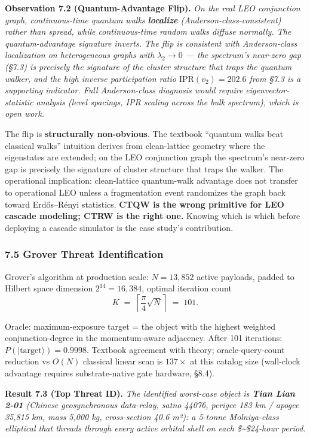 \documentclass[
]{article}
\begin{document}
\textbf{Observation 7.2 (Quantum-Advantage Flip).} \emph{On the real LEO
conjunction graph, continuous-time quantum walks \textbf{localize}
(Anderson-class-consistent) rather than spread, while continuous-time
random walks diffuse normally. The quantum-advantage signature inverts.
The flip is consistent with Anderson-class localization on heterogeneous
graphs with \(\lambda_2 \to 0\) --- the spectrum's near-zero gap (§7.3)
is precisely the signature of the cluster structure that traps the
quantum walker, and the high inverse participation ratio
\(\text{IPR}(v_2) = 202.6\) from §7.3 is a supporting indicator. Full
Anderson-class diagnosis would require eigenvector-statistic analysis
(level spacings, IPR scaling across the bulk spectrum), which is open
work.}

The flip is \textbf{structurally non-obvious}. The textbook ``quantum
walks beat classical walks'' intuition derives from clean-lattice
geometry where the eigenstates are extended; on the LEO conjunction
graph the spectrum's near-zero gap is precisely the signature of cluster
structure that traps the walker. The operational implication:
clean-lattice quantum-walk advantage does not transfer to operational
LEO unless a fragmentation event randomizes the graph back toward
Erdős--Rényi statistics. \textbf{CTQW is the wrong primitive for LEO
cascade modeling; CTRW is the right one.} Knowing which is which before
deploying a cascade simulator is the case study's contribution.

\subsubsection{7.5 Grover Threat
Identification}\label{grover-threat-identification}

Grover's algorithm at production scale: \(N = 13{,}852\) active
payloads, padded to Hilbert space dimension \(2^{14} = 16{,}384\),
optimal iteration count
\[K \;=\; \left\lceil \frac{\pi}{4} \sqrt{N} \right\rceil \;=\; 101. \tag{7.2}\]

Oracle: maximum-exposure target = the object with the highest weighted
conjunction-degree in the momentum-aware adjacency. After 101
iterations: \(P(|\text{target}\rangle) = 0.9998\). Textbook agreement
with theory; oracle-query-count reduction vs \(O(N)\) classical linear
scan is \(137\times\) at this catalog size (wall-clock advantage
requires substrate-native gate hardware, §8.4).

\textbf{Result 7.3 (Top Threat ID).} \emph{The identified worst-case
object is \textbf{Tian Lian 2-01} (Chinese geosynchronous data-relay,
satno 44076, perigee 183 km / apogee 35,815 km, mass 5,000 kg,
cross-section 40.6 m²): a 5-tonne Molniya-class elliptical that threads
through every active orbital shell on each \$\sim\$24-hour period.}
\end{document}
